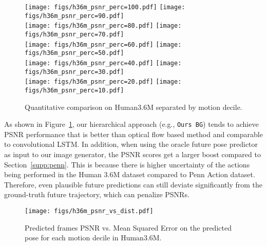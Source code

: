 \documentclass{article}
\begin{document}
\begin{appendix}
\begin{figure}[htb!]
\centering
\texttt{[image: figs/h36m\_psnr\_perc=100.pdf]}
\hspace{.8cm}
\texttt{[image: figs/h36m\_psnr\_perc=90.pdf]} \\
\texttt{[image: figs/h36m\_psnr\_perc=80.pdf]}
\hspace{.8cm}
\texttt{[image: figs/h36m\_psnr\_perc=70.pdf]} \\
\texttt{[image: figs/h36m\_psnr\_perc=60.pdf]}
\hspace{.8cm}
\texttt{[image: figs/h36m\_psnr\_perc=50.pdf]} \\
\texttt{[image: figs/h36m\_psnr\_perc=40.pdf]}
\hspace{.8cm}
\texttt{[image: figs/h36m\_psnr\_perc=30.pdf]} \\
\texttt{[image: figs/h36m\_psnr\_perc=20.pdf]}
\hspace{.8cm}
\texttt{[image: figs/h36m\_psnr\_perc=10.pdf]}
\vspace{-.3cm}
\caption{Quantitative comparison on Human3.6M separated by motion decile.}
\label{fig:h36m_motion1}
\vspace{-2cm}
\end{figure}


\clearpage

As shown in Figure~\ref{fig:h36m_motion1}, our hierarchical approach (e.g., \texttt{Ours BG}) tends to achieve PSNR performance that is better than optical flow based method and comparable to convolutional LSTM. In addition, when using the oracle future pose predictor as input to our image generator, the PSNR scores get a larger boost compared to Section~\ref{supp:penn}. 
This is because there is higher uncertainty of the actions being performed in the Human 3.6M dataset compared to Penn Action dataset. 
Therefore, even plausible future predictions can still deviate significantly from the ground-truth future trajectory, which can penalize PSNRs.

\begin{figure}[htb!]
\centering
\vspace{-10pt}
\texttt{[image: figs/h36m\_psnr\_vs\_dist.pdf]}
\vspace{-.3cm}
\caption{Predicted frames PSNR vs. Mean Squared Error on the predicted pose for each motion decile in Human3.6M.}
\label{fig:h36m_corr}
\end{figure}
\vspace{-.3cm}


\end{appendix}
\end{document}
